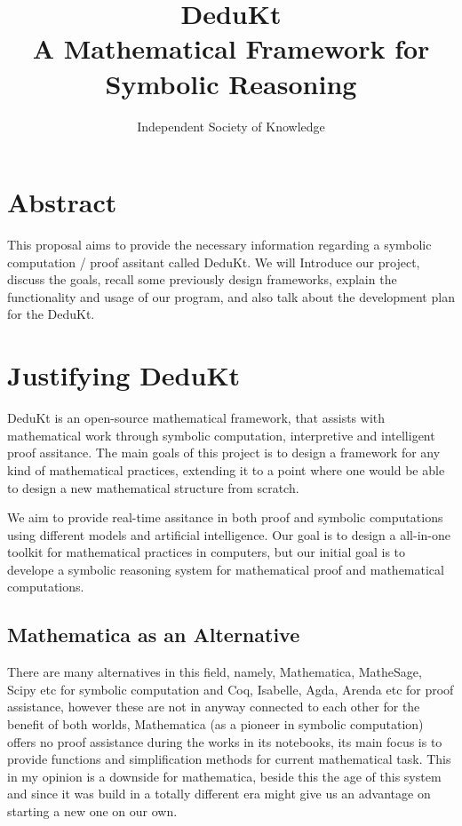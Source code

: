 \documentclass[9pt,a4paper,twocolumn]{article}
\title{DeduKt \\ \large A Mathematical Framework for Symbolic Reasoning}
\author{Independent Society of Knowledge}
\begin{document}
\maketitle

\section*{Abstract}
This proposal aims to provide the necessary information regarding a symbolic computation / proof assitant called DeduKt. We will Introduce our project, discuss the goals, recall some previously design frameworks, explain the functionality and usage of our program, and also talk about the development plan for the DeduKt.
\tableofcontents \newpage

\section{Justifying DeduKt}
    DeduKt is an open-source mathematical framework, that assists with mathematical work through symbolic computation, interpretive and intelligent proof assitance. The main goals of this project is to design a framework for any kind of mathematical practices, extending it to a point where one would be able to design a new mathematical structure from scratch. 
    
    We aim to provide real-time assitance in both proof and symbolic computations using different models and artificial intelligence. Our goal is to design a all-in-one toolkit for mathematical practices in computers, but our initial goal is to develope a symbolic reasoning system for mathematical proof and mathematical computations.

    \subsection{Mathematica as an Alternative}
        There are many alternatives in this field, namely, Mathematica, MatheSage, Scipy etc for symbolic computation and Coq, Isabelle, Agda, Arenda etc for proof assistance, however these are not in anyway connected to each other for the benefit of both worlds, Mathematica (as a pioneer in symbolic computation) offers no proof assistance during the works in its notebooks, its main focus is to provide functions and simplification methods for current mathematical task. This in my opinion is a downside for mathematica, beside this the age of this system and since it was build in a totally different era might give us an advantage on starting a new one on our own.
\end{document}

